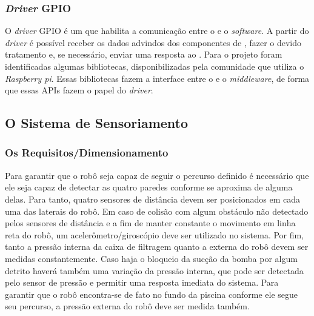 \subsubsection{\textit{Driver} GPIO}
O \textit{driver} GPIO é um \software que habilita a comunicação entre o \hardware e o \textit{software}. A partir do \textit{driver} é possível receber  os dados advindos dos componentes de \hardware, fazer o devido tratamento e, se necessário, enviar uma resposta ao \hardware \cite{windows2016}. Para o projeto foram identificadas algumas bibliotecas, disponibilizadas pela comunidade que utiliza o \textit{Raspberry pi}. Essas bibliotecas fazem a interface entre o \hardware e o \textit{middleware}, de forma que essas \textsf{APIs} fazem o papel do \textit{driver}.

\subsection{O Sistema de Sensoriamento}
\subsubsection{Os Requisitos/Dimensionamento}
Para garantir que o robô seja capaz de seguir o percurso definido é necessário que ele seja capaz de detectar as quatro paredes conforme se aproxima de alguma delas. Para tanto, quatro sensores de distância devem ser posicionados em cada uma das laterais do robô. Em caso de colisão com algum obstáculo não detectado pelos sensores de distância e a fim de manter constante o movimento em linha reta do robô, um acelerômetro/giroscópio deve ser utilizado no sistema. Por fim, tanto a pressão interna da caixa de filtragem quanto a externa do robô devem ser medidas constantemente. Caso haja o bloqueio da sucção da bomba por algum detrito haverá também uma variação da pressão interna, que pode ser detectada pelo sensor de pressão e permitir uma resposta imediata do sistema. Para garantir que o robô encontra-se de fato no fundo da piscina conforme ele segue seu percurso, a pressão externa do robô deve ser medida também.

